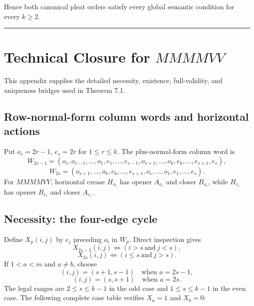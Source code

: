 \documentclass[11pt]{article}
\theoremstyle{definition}
\theoremstyle{remark}
\begin{document}
Hence both canonical pleat orders satisfy every global semantic
condition for every \(k\ge2\).

\begin{center}\rule{0.5\linewidth}{0.5pt}\end{center}

\section{\texorpdfstring{Technical Closure for
\(MMMMVV\)}{Technical Closure for MMMMVV}}\label{appendix-d.-technical-closure-for-mmmmvv}

This appendix supplies the detailed necessity, existence, full-validity,
and uniqueness bridges used in Theorem 7.1.

\subsection{Row-normal-form column words and horizontal
actions}\label{d.1.-row-normal-form-column-words-and-horizontal-actions}

Put \(o_r=2r-1\), \(e_r=2r\) for \(1\le r\le k\). The plus-normal-form
column word is \[
W_{2s-1}=(o_s,o_{s-1},\ldots,o_1,e_1,\ldots,e_{s-1},o_{s+1},\ldots,o_k,e_k,\ldots,e_{s+1},e_s),
\] \[
W_{2s}=(o_{s+1},\ldots,o_k,e_k,\ldots,e_{s+1},o_s,\ldots,o_1,e_1,\ldots,e_s).
\] For \(MMMMVV\), horizontal crease \(H_{o_r}\) has opener \(A_{o_r}\)
and closer \(B_{o_r}\), while \(H_{e_r}\) has opener \(B_{e_r}\) and
closer \(A_{e_r}\).

\subsection{Necessity: the four-edge
cycle}\label{d.2.-necessity-the-four-edge-cycle}

Define \(X_p(i,j)\) by \(e_j\) preceding \(o_i\) in \(W_p\). Direct
inspection gives \[
X_{2s-1}(i,j)\iff (i>s\ \text{and}\ j<s),
\] \[
X_{2s}(i,j)\iff (i\le s\ \text{and}\ j>s).
\] If \(1<a<m\) and \(a\ne b\), choose \[
(i,j)=(s+1,s-1)\quad\text{when }a=2s-1,
\] \[
(i,j)=(s,s+1)\quad\text{when }a=2s.
\] The legal ranges are \(2\le s\le k-1\) in the odd case and
\(1\le s\le k-1\) in the even case. The following complete case table
verifies \(X_a=1\) and \(X_b=0\):
\end{document}
